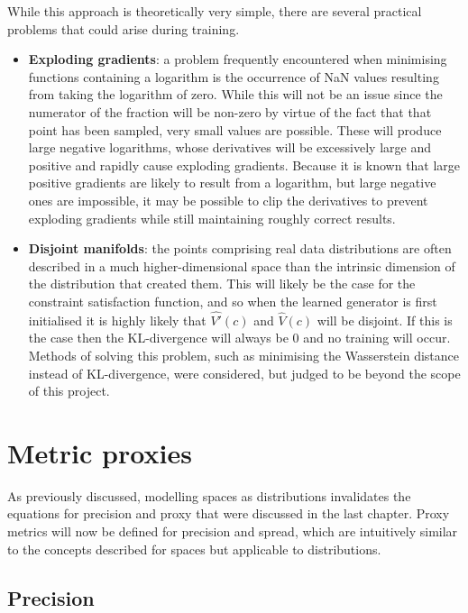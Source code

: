\documentclass[../../main.tex]{subfiles}
\begin{document}
While this approach is theoretically very simple, there are several practical problems that could arise during training.
\begin{itemize}
    \item[] \textbf{Exploding gradients}: a problem frequently encountered when minimising functions containing a logarithm is the occurrence of NaN values resulting from taking the logarithm of zero.
    While this will not be an issue since the numerator of the fraction will be non-zero by virtue of the fact that that point has been sampled, very small values are possible.
    These will produce large negative logarithms, whose derivatives will be excessively large and positive and rapidly cause exploding gradients.
    Because it is known that large positive gradients are likely to result from a logarithm, but large negative ones are impossible, it may be possible to clip the derivatives to prevent exploding gradients while still maintaining roughly correct results.   
    \item[] \textbf{Disjoint manifolds}: the points comprising real data distributions are often described in a much higher-dimensional space than the intrinsic dimension of the distribution that created them.
    This will likely be the case for the constraint satisfaction function, and so when the learned generator is first initialised it is highly likely that $\hat{V'}(c)$ and $\hat{V}(c)$ will be disjoint.
    If this is the case then the KL-divergence will always be 0 and no training will occur.
    Methods of solving this problem, such as minimising the Wasserstein distance instead of KL-divergence, were considered, but judged to be beyond the scope of this project.
  \end{itemize}

\section{Metric proxies}

As previously discussed, modelling spaces as distributions invalidates the equations for precision and proxy that were discussed in the last chapter.
Proxy metrics will now be defined for precision and spread, which are intuitively similar to the concepts described for spaces but applicable to distributions.

\subsection{Precision}
\end{document}
